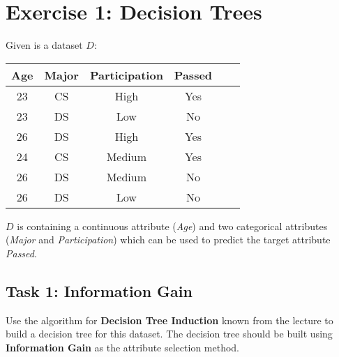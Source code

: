 \documentclass[
english,
smallborders
]{i6prcsht}
\begin{document}
\section*{Exercise 1: Decision Trees}

\begin{comment}
Age; Age1; Age2; Major; Participation; Passed?
23; <=23,5; <=25; CS; High; Yes
23; <=23,5; <=25; DS; Low; No
26; >23,5; >25; DS; High; Yes
24; >23,5; <=25; CS; Medium; Yes
26; >23,5; >25; DS; Medium; No
26; >23,5; >25; DS; Low; No

\end{comment}

Given is a dataset $D$:

\begin{center}
	\begin{tabular}{|c|c|c|c|c|c|}
		\hline
		\textbf{Age} & \textbf{Major} & \textbf{Participation} & \textbf{Passed} \\ \hline
		23           & CS             & High                   & Yes             \\ \hline
		23           & DS             & Low                    & No              \\ \hline
		26           & DS             & High                   & Yes             \\ \hline
		24           & CS             & Medium                 & Yes             \\ \hline
		26           & DS             & Medium                 & No              \\ \hline
		26           & DS             & Low                    & No              \\ \hline
	\end{tabular}
\end{center}

$D$ is containing a continuous attribute (\textit{Age}) and two categorical attributes (\textit{Major} and \textit{Participation}) which can be used to predict the target attribute \textit{Passed}.

\subsection*{Task 1: Information Gain}

Use the algorithm for \textbf{Decision Tree Induction} known from the lecture to build a decision tree for this dataset. The decision tree should be built using \textbf{Information Gain} as the attribute selection method.
\end{document}
